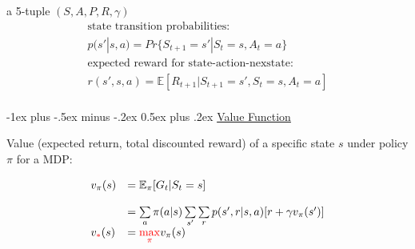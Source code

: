 \documentclass[10pt,landscape]{article}
\makeatletter
\renewcommand{\section}{\@startsection{section}{1}{0mm}%
    {-1ex plus -.5ex minus -.2ex}%
    {0.5ex plus .2ex}%
    {\normalfont\large\bfseries}}
\makeatother
\begin{document}
\begin{multicols}{3}
a 5-tuple $(S, A, P, R, \gamma)$ %
\begin{equation}
        \begin{array}{l}
                 \text{state transition probabilities:} \\
        p(s'|s,a) = Pr \{S_{t + 1} = s' | S_t=s,A_t=a\} \\
                \text{expected reward for state-action-nexstate:}\\
        r(s',s, a) = \mathbb{E}[ R_{t + 1} | S_{t + 1}=s',S_t=s,A_t=a]  \\
        \end{array}
\end{equation}

\section{\href{https://en.wikipedia.org/wiki/Reinforcement_learning\#Value_function}{Value Function}}

Value (expected return, total discounted reward) of a specific state $s$ under policy $\pi$ for a MDP:

\begin{equation}
\begin{array}{l l}
    v_{\pi}(s) &= \mathbb{E}_{\pi}[G_t | S_t = s]\\
    \\
    &= \sum\limits_{a} \pi(a | s) \sum\limits_{s'}\sum\limits_{r} p(s', r | s, a)[r + \gamma v_{\pi}(s')]\\
    v_{\textcolor{red}{\ast}}(s) &= \textcolor{red}{\max\limits_{\pi}} v_\pi(s)
\end{array}
\label{eq: value_func}
\end{equation}


\end{multicols}
\end{document}

